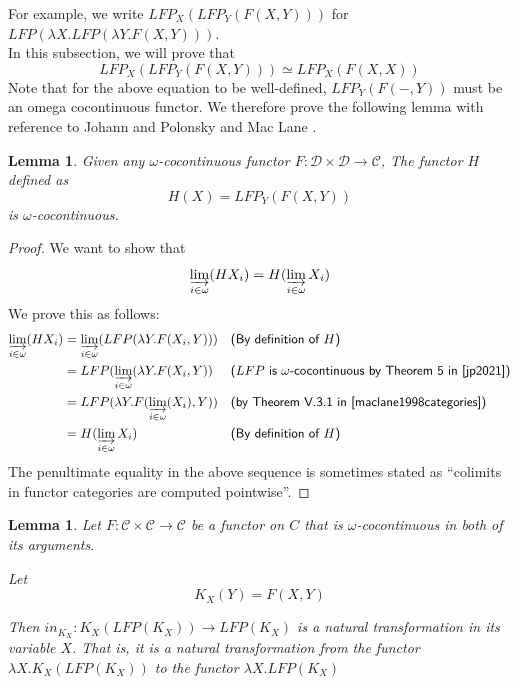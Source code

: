\documentclass{msthesis}
\newtheorem{lemma}[theorem]{Lemma}
\theoremstyle{definition}
\newcommand{\mcC}{\mathcal{C}}
\newcommand{\mcD}{\mathcal{D}}
\newcommand{\colim}{\varinjlim}
\begin{document}
For example, we write $LFP_X(LFP_Y(F(X,Y)))$ for $LFP(\lambda X. LFP (\lambda Y. F(X,Y)))$. \\

In this subsection, we will prove that
\[ LFP_X(LFP_Y(F(X,Y))) \simeq LFP_X(F(X,X)) \]
Note that for the above equation to be well-defined, $LFP_Y(F(-,Y))$ must be an omega cocontinuous functor. We therefore prove the following lemma with reference to Johann and Polonsky \cite{jp2021} and Mac Lane \cite{maclane1998categories}.

\begin{lemma}
    Given any $\omega$-cocontinuous functor $F : \mcD \times \mcD \to \mcC$, The functor $H$ defined as
    \[ H(X) = LFP_Y(F(X, Y)) \]
    is $\omega$-cocontinuous.
\end{lemma}

\begin{proof}
    We want to show that 
    \[ \colim_{i \in \omega}(HX_i) = H(\colim_{i \in \omega} X_i) \]
    We prove this as follows:
    \begin{align*}
        \colim_{i \in \omega}(HX_i) 
        &= \colim_{i \in \omega}(LFP(\lambda Y.F(X_i,Y)))
        &&\textsf{(By definition of $H$)} \\
        &= LFP(\colim_{i \in \omega}(\lambda Y.F(X_i, Y))
        &&\textsf{($LFP$ is $\omega$-cocontinuous by Theorem 5 in \cite{jp2021})} \\
        &= LFP(\lambda Y. F(\colim_{i \in \omega}(X_i), Y)) 
        &&\textsf{(by Theorem V.3.1 in \cite{maclane1998categories})}\\
        &= H(\colim_{i \in \omega} X_i) &
        &\textsf{(By definition of $H$)} 
    \end{align*}
The penultimate equality in the above sequence is sometimes stated as ``colimits in functor categories are computed pointwise''.
\end{proof}

\begin{lemma}\label{lemma:inisnatural}
    Let $F : \mcC \times \mcC \to \mcC$ be a functor on $C$ that is $\omega$-cocontinuous in both of its arguments.

    Let
    \[ K_X(Y) = F(X, Y) \]

    Then $in_{K_X} : K_X(LFP(K_X)) \to LFP(K_X)$ is a natural transformation in its variable $X$.  That is, it is a natural transformation from the functor $\lambda X. K_X(LFP(K_X))$ to the functor $\lambda X. LFP(K_X)$
\end{lemma}
\end{document}
